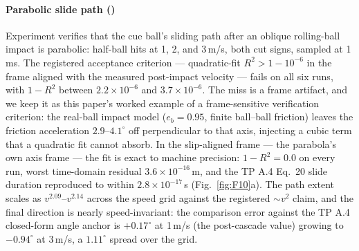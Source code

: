 \paragraph{Parabolic slide path ()}
Experiment  verifies that the cue ball's sliding path after an
oblique rolling-ball impact is parabolic: half-ball hits at 1, 2, and
3\,m/s, both cut signs, sampled at 1\,ms. The registered acceptance
criterion --- quadratic-fit $R^2 > 1 - 10^{-6}$ in the frame aligned with
the measured post-impact velocity --- fails on all six runs, with
$1 - R^2$ between $2.2\times10^{-6}$ and $3.7\times10^{-6}$. The miss is a
frame artifact, and we keep it as this paper's worked example of a
frame-sensitive verification criterion: the real-ball impact model ($e_b = 0.95$,
finite ball--ball friction) leaves the friction acceleration
$2.9$--$4.1^\circ$ off perpendicular to that axis, injecting a cubic term
that a quadratic fit cannot absorb. In the slip-aligned frame --- the
parabola's own axis frame --- the fit is exact to machine precision:
$1 - R^2 = 0.0$ on every run, worst time-domain residual
$3.6\times10^{-16}$\,m, and the TP A.4 Eq.~20 slide duration reproduced to
within $2.8\times10^{-17}$\,s \citep{alciatore_tp_catalog}
(Fig.~\ref{fig:F10}a). The path extent scales as $v^{2.09}$--$v^{2.14}$
across the speed grid against the registered $\sim v^2$ claim, and the
final direction is nearly speed-invariant: the comparison error against
the TP A.4 closed-form angle anchor is $+0.17^\circ$ at 1\,m/s (the
post-cascade value) growing to $-0.94^\circ$ at 3\,m/s, a $1.11^\circ$
spread over the grid.

